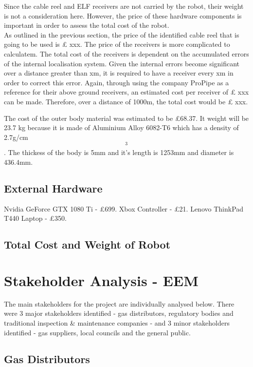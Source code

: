 \documentclass[11pt]{article}		%
\begin{document}
	        
	        Since the cable reel and ELF receivers are not carried by the robot, their weight is not a consideration here. However, the price of these hardware components is important in order to assess the total cost of the robot. \\
		    \hspace*{3ex}As outlined in the previous section, the price of the identified cable reel that is going to be used is £ xxx. The price of the receivers is more complicated to calculatem. The total cost of the receivers is dependent on the accumulated errors of the internal localisation system. Given the internal errors become significant over a distance greater than xm, it is required to have a receiver every xm in order to correct this error. Again, through using the company ProPipe as a reference for their above ground receivers, an estimated cost per receiver of £ xxx can be made. Therefore, over a distance of 1000m, the total cost would be £ xxx. 
		    
		    The cost of the outer body material was estimated to be £68.37. It weight will be 23.7 kg because it is made of Aluminium Alloy 6082-T6 which has a density of 2.7g/cm\[^3\]. The thickess of the body is 5mm and it's length is 1253mm and diameter is 436.4mm.

		\subsection{External Hardware}
			Nvidia GeForce GTX 1080 Ti - £699. Xbox Controller - £21. Lenovo ThinkPad T440 Laptop - £350.
		
		\subsection{Total Cost and Weight of Robot}
		
	\section{Stakeholder Analysis - EEM}
	
		The main stakeholders for the project are individually analysed below.
		There were 3 major stakeholders identified - gas distributors, regulatory bodies and traditional inspection \& maintenance companies - and 3 minor stakeholders identified - gas suppliers, local councils and the general public.
		
		\subsection[Gas Distributors]{Gas Distributors}
		
\end{document}
